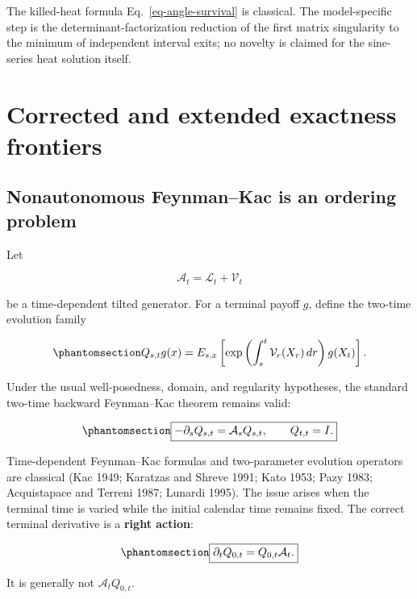 \documentclass[
  english,
  11pt,
  letterpaper,
  DIV=11,
  numbers=noendperiod]{scrartcl}
\theoremstyle{plain}
\theoremstyle{plain}
\theoremstyle{plain}
\theoremstyle{plain}
\theoremstyle{remark}
\begin{document}
The killed-heat formula Eq.~\ref{eq-angle-survival} is classical. The
model-specific step is the determinant-factorization reduction of the
first matrix singularity to the minimum of independent interval exits;
no novelty is claimed for the sine-series heat solution itself.

\section{Corrected and extended exactness
frontiers}\label{sec-frontiers}

\subsection{Nonautonomous Feynman--Kac is an ordering
problem}\label{sec-nonautonomous}

Let

\[
\mathcal A_t=\mathcal L_t+\mathcal V_t
\]

be a time-dependent tilted generator. For a terminal payoff \(g\),
define the two-time evolution family

\begin{equation}\protect\phantomsection\label{eq-evolution-family}{
Q_{s,t}g(x)
=E_{s,x}\left[
\exp\left(\int_s^t\mathcal V_r(X_r)\,dr\right)
g(X_t)
\right].
}\end{equation}

Under the usual well-posedness, domain, and regularity hypotheses, the
standard two-time backward Feynman--Kac theorem remains valid:

\begin{equation}\protect\phantomsection\label{eq-two-time-backward}{
\boxed{
-\partial_sQ_{s,t}
=\mathcal A_sQ_{s,t},
\qquad
Q_{t,t}=I.
}
}\end{equation}

Time-dependent Feynman--Kac formulas and two-parameter evolution
operators are classical (Kac 1949; Karatzas and Shreve 1991; Kato 1953;
Pazy 1983; Acquistapace and Terreni 1987; Lunardi 1995). The issue
arises when the terminal time is varied while the initial calendar time
remains fixed. The correct terminal derivative is a \textbf{right
action}:

\begin{equation}\protect\phantomsection\label{eq-right-action}{
\boxed{
\partial_tQ_{0,t}=Q_{0,t}\mathcal A_t.
}
}\end{equation}

It is generally not \(\mathcal A_tQ_{0,t}\).
\end{document}
